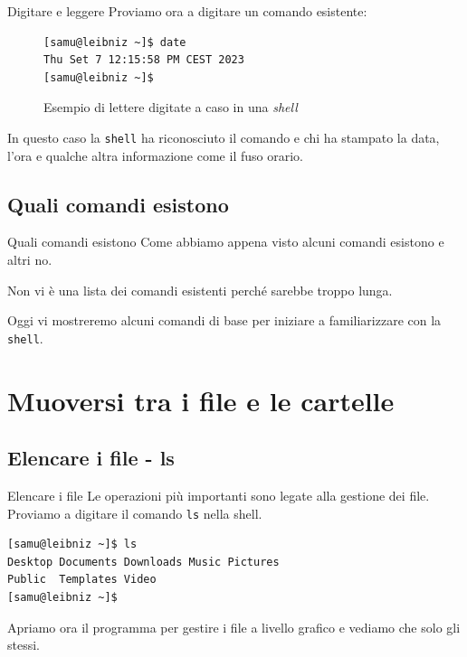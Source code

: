 \documentclass{beamer}
\begin{document}
\begin{frame}[fragile]{Digitare e leggere}
  Proviamo ora a digitare un comando esistente:
  \begin{figure}
        \begin{lstlisting}
[samu@leibniz ~]$ date
Thu Set 7 12:15:58 PM CEST 2023
[samu@leibniz ~]$
    \end{lstlisting}
    \caption{Esempio di lettere digitate a caso in una \textit{shell}}
  \end{figure}
  \pause
  In questo caso la \texttt{shell} ha riconosciuto il comando e chi ha stampato
  la data, l'ora e qualche altra informazione come il fuso orario.
\end{frame}

\subsection{Quali comandi esistono}
\begin{frame}{Quali comandi esistono}
  Come abbiamo appena visto alcuni comandi esistono e altri no.\bigskip

  Non vi è una lista dei comandi esistenti perché sarebbe troppo lunga.\bigskip

  Oggi vi mostreremo alcuni comandi di base per iniziare a familiarizzare con la
  \texttt{shell}.
\end{frame}

\section{Muoversi tra i file e le cartelle}

\subsection{Elencare i file - ls}
\begin{frame}[fragile]{Elencare i file}
  Le operazioni più importanti sono legate alla gestione dei file. Proviamo a 
  digitare il comando \texttt{ls} nella shell.\bigskip

    \begin{lstlisting}
[samu@leibniz ~]$ ls
Desktop Documents Downloads Music Pictures 
Public  Templates Video
[samu@leibniz ~]$
    \end{lstlisting}

  Apriamo ora il programma per gestire i file a livello grafico e vediamo che
  solo gli stessi.
\end{frame}
\end{document}
